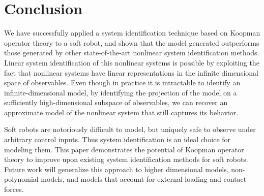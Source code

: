 \section{Conclusion}
\label{sec:conclusion}

We have successfully applied a system identification technique based on Koopman operator theory to a soft robot, and shown that the model generated outperforms those generated by other state-of-the-art nonlinear system identification methods.
Linear system identification of this nonlinear systems is possible by exploiting the fact that nonlinear systems have linear representations in the infinite dimensional space of observables.
Even though in practice it is intractable to identify an infinite-dimensional model, by identifying the projection of the model on a sufficiently high-dimensional subspace of observables, we can recover an approximate model of the nonlinear system that still captures its behavior.

Soft robots are notoriously difficult to model, but uniquely safe to observe under arbitrary control inputs.
Thus system identification is an ideal choice for modeling them.
This paper demonstrates the potential of Koopman operator theory to improve upon existing system identification methods for soft robots.
Future work will generalize this approach to higher dimensional models, non-polynomial models, and models that account for external loading and contact forces.








